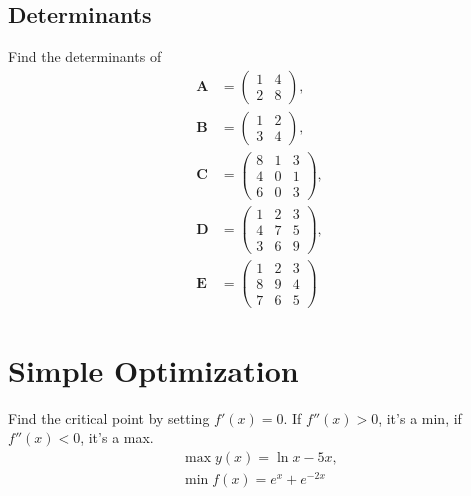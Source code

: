 \documentclass[10pt,a4paper]{article}
\theoremstyle{definition}\newtheorem{definition}{Definition}
\theoremstyle{definition}\newtheorem{fact}{Fact}
\theoremstyle{definition}\newtheorem{remark}{Remark}
\theoremstyle{definition}\newtheorem{ex}{Ex.}
\theoremstyle{definition}\newtheorem{project}{Project}
\theoremstyle{definition}\newtheorem{problem}{Problem}
\theoremstyle{definition}\newtheorem{example}{Example}
\def\E{\mathbb E}
\def\A{\mathbf A}
\def\B{\mathbf B}
\def\C{\mathbf C}
\def\D{\mathbf D}
\def\E{\mathbf E}
\begin{document}
	\subsection{Determinants}	
	Find the determinants of
	\begin{align}
		\A &= \begin{pmatrix}
			1 & 4 \\ 2 & 8
		\end{pmatrix}, \\
		\B &= \begin{pmatrix}
			1 & 2 \\ 3 & 4
		\end{pmatrix}, \\
		\C &= \begin{pmatrix}
				8 & 1  & 3  \\
				4 & 0  & 1  \\
				6 & 0  & 3  
			\end{pmatrix}, \\
		\D &= \begin{pmatrix}
				1 & 2  & 3  \\
				4 & 7  & 5  \\
				3 & 6  & 9  
			\end{pmatrix}, \\
		\E &= \begin{pmatrix}
				1 & 2  & 3  \\
				8 & 9  & 4  \\
				7 & 6  & 5  
			\end{pmatrix}	
	\end{align}
	
	\section{Simple Optimization}
	Find the critical point by setting $f'(x) = 0$. If $f''(x) > 0$, it's a min, if $f''(x)<0$, it's a max.
	\begin{align}
		\max y(x) = \ln x - 5x, \\
		\min f(x) = e^x + e^{-2x}
	\end{align}
	
\end{document}
